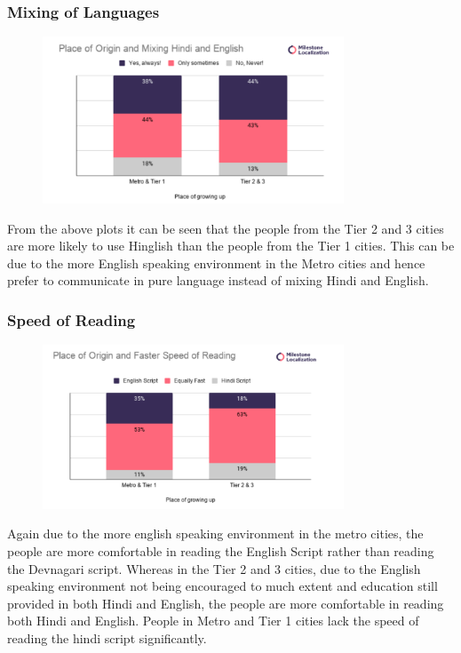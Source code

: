 \documentclass{article}
\begin{document}
\subsubsection{Mixing of Languages}

\begin{figure}[H]
    \centering
    \includegraphics[width=0.8\textwidth]{plots/origin_mixing_language.png}
\end{figure}

From the above plots it can be seen that the people from the Tier 2 and 3 cities are more likely to use Hinglish than the people from the Tier 1 cities. This can be due to the more English speaking environment in the Metro cities and hence prefer to communicate in pure language instead of mixing Hindi and English.

\subsubsection{Speed of Reading}

\begin{figure}[H]
    \centering
    \includegraphics[width=0.8\textwidth]{plots/origin_faster_read.png}
\end{figure}

Again due to the more english speaking environment in the metro cities, the people are more comfortable in reading the English Script rather than reading the Devnagari script. Whereas in the Tier 2 and 3 cities, due to the English speaking environment not being encouraged to much extent and education still provided in both Hindi and English, the people are more comfortable in reading both Hindi and English. People in Metro and Tier 1 cities lack the speed of reading the hindi script significantly.
\end{document}
